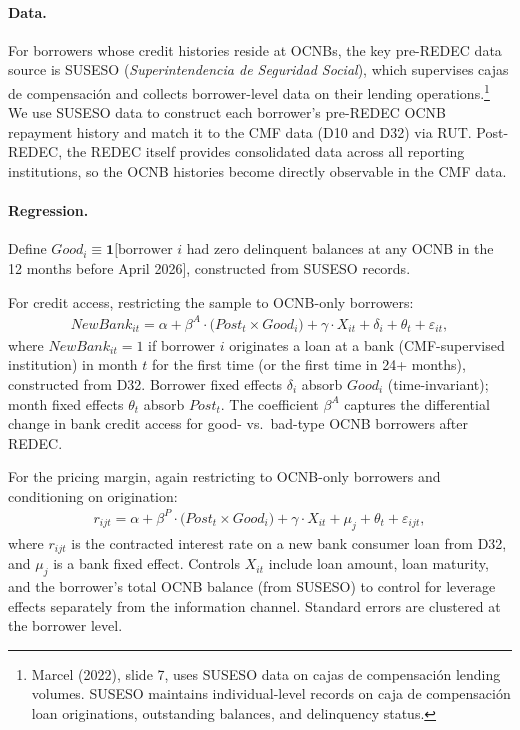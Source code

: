 \documentclass[12pt]{article}
\theoremstyle{plain}
\theoremstyle{plain}
\begin{document}
\paragraph{Data.} For borrowers whose credit histories reside at OCNBs, the key pre-REDEC data source is SUSESO (\textit{Superintendencia de Seguridad Social}), which supervises cajas de compensaci\'on and collects borrower-level data on their lending operations.\footnote{Marcel (2022), slide 7, uses SUSESO data on cajas de compensaci\'on lending volumes. SUSESO maintains individual-level records on caja de compensaci\'on loan originations, outstanding balances, and delinquency status.} We use SUSESO data to construct each borrower's pre-REDEC OCNB repayment history and match it to the CMF data (D10 and D32) via RUT. Post-REDEC, the REDEC itself provides consolidated data across all reporting institutions, so the OCNB histories become directly observable in the CMF data.

\paragraph{Regression.} Define $Good_i \equiv \mathbf{1}[\text{borrower } i$  had zero delinquent balances at any OCNB in the 12 months before April 2026], constructed from SUSESO records.

For credit access, restricting the sample to OCNB-only borrowers:
\begin{align}
    NewBank_{it} = \alpha + \beta^{A} \cdot \bigl(Post_t \times Good_i\bigr) + \gamma \cdot X_{it} + \delta_i + \theta_t + \varepsilon_{it},
\label{eq:access_hetero}
\end{align}
where $NewBank_{it} = 1$ if borrower $i$ originates a loan at a bank (CMF-supervised institution) in month $t$ for the first time (or the first time in 24+ months), constructed from D32. Borrower fixed effects $\delta_i$ absorb $Good_i$ (time-invariant); month fixed effects $\theta_t$ absorb $Post_t$. The coefficient $\beta^{A}$ captures the differential change in bank credit access for good- vs.\ bad-type OCNB borrowers after REDEC.

For the pricing margin, again restricting to OCNB-only borrowers and conditioning on origination:
\begin{align}\label{eq:pricing_hetero}
    r_{ijt} = \alpha + \beta^{P} \cdot \bigl(Post_t \times Good_i\bigr) + \gamma \cdot X_{it} + \mu_j + \theta_t + \varepsilon_{ijt},
\end{align}
where $r_{ijt}$ is the contracted interest rate on a new bank consumer loan from D32, and $\mu_j$ is a bank fixed effect. Controls $X_{it}$ include loan amount, loan maturity, and the borrower's total OCNB balance (from SUSESO) to control for leverage effects separately from the information channel. Standard errors are clustered at the borrower level.
\end{document}
